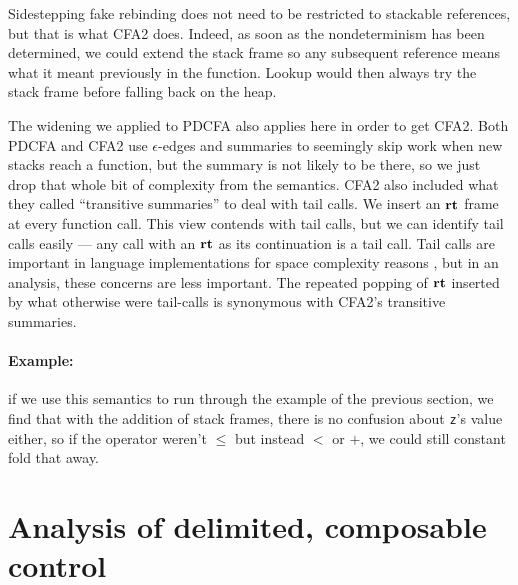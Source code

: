 \documentclass{llncs}
\begin{document}
Sidestepping fake rebinding does not need to be restricted to
stackable references, but that is what CFA2 does. Indeed, as soon as
the nondeterminism has been determined, we could extend the stack
frame so any subsequent reference means what it meant previously in
the function. Lookup would then always try the stack frame before
falling back on the heap.

The widening we applied to PDCFA also applies here in order to get
CFA2. Both PDCFA and CFA2 use $\epsilon$-edges and summaries to
seemingly skip work when new stacks reach a function, but the summary
is not likely to be there, so we just drop that whole bit of
complexity from the semantics. CFA2 also included what they called
``transitive summaries'' to deal with tail calls. We insert an $\mathbf{rt}$
frame at every function call.  This view contends with tail calls, but
we can identify tail calls easily --- any call with an $\mathbf{rt}$ as its
continuation is a tail call. Tail calls are important in language
implementations for space complexity reasons
\citep{ianjohnson:clinger:tail-calls:1998}, but in an analysis, these
concerns are less important. The repeated popping of $\mathbf{rt}$ inserted
by what otherwise were tail-calls is synonymous with CFA2's transitive
summaries.

\paragraph{Example:} if we use this semantics to run through the
example of the previous section, we find that with the addition of
stack frames, there is no confusion about \texttt{z}'s value either,
so if the operator weren't $\le$ but instead $<$ or $+$, we could
still constant fold that away.

\section{Analysis of delimited, composable control}
\label{sec:sr}
\end{document}
